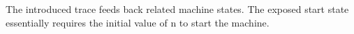\documentclass{llncs}
\begin{document}
\vspace{-20px}
\begin{multicols}{2}
\begin{center}
\end{center}
\columnbreak
\begin{center}
\end{center}  
\end{multicols}

The introduced {{trace}} feeds back related machine states. The
exposed start state essentially requires the initial value of {{n}} to
start the machine. 

\begin{center}
\end{center}
\end{document}
